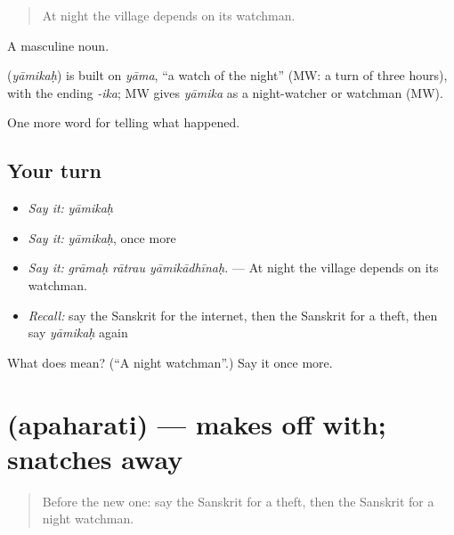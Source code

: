\begin{quote}
At night the village depends on its watchman.
\end{quote}

A masculine noun.

\begin{cousinweb}
\textbf{} (\emph{yāmikaḥ}) is built on \emph{yāma}, \textquotedblleft{}a watch of the night\textquotedblright{} (MW: a turn of three hours), with the ending \emph{-ika}; MW gives \emph{yāmika} as a night-watcher or watchman (MW).
\end{cousinweb}

\begin{grammarlens}[title={What you've built}]
One more word for telling what happened.
\end{grammarlens}

\subsection*{Your turn}
\begin{itemize}
\raggedright
  \item \emph{Say it:} \emph{yāmikaḥ}
  \item \emph{Say it:} \emph{yāmikaḥ}, once more
  \item \emph{Say it:} \emph{grāmaḥ rātrau yāmikādhīnaḥ.} — At night the village depends on its watchman.
  \item \emph{Recall:} say the Sanskrit for the internet, then the Sanskrit for a theft, then say \emph{yāmikaḥ} again
\end{itemize}

\begin{tcolorbox}[breakable,colback=teal!4,colframe=teal!35!black,title={Before you move on}]
What does  mean? (\textquotedblleft{}A night watchman\textquotedblright{}.) Say it once more.
\end{tcolorbox}
\section[\texorpdfstring{\sk{अपहरति} (apaharati)}{अपहरति (apaharati)}]{ (apaharati) — makes off with; snatches away}

\label{lesson:SA-C286-apaharati}



\begin{quote}
Before the new one: say the Sanskrit for a theft, then the Sanskrit for a night watchman.
\end{quote}

